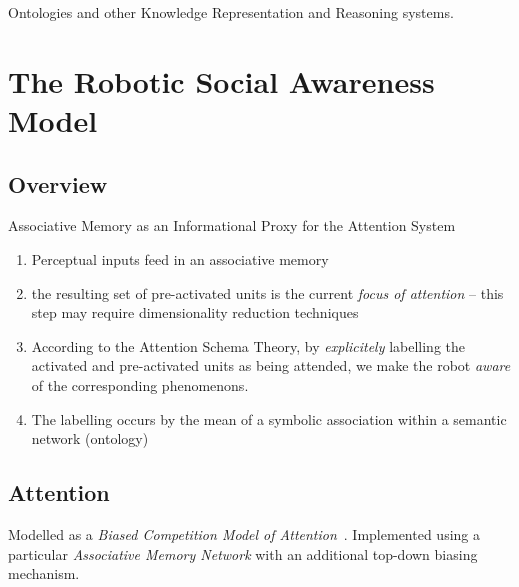 \documentclass[a4paper]{article}
\begin{document}
Ontologies and other Knowledge Representation and Reasoning systems.


\section{The Robotic Social Awareness Model}

\subsection{Overview}

Associative Memory as an Informational Proxy for the Attention System


\begin{enumerate}
    \item Perceptual inputs feed in an associative memory

    \item the resulting set of pre-activated units is the current
        \emph{focus of attention} -- this step may require dimensionality
        reduction techniques

    \item According to the Attention Schema Theory, by \emph{explicitely}
        labelling the activated and pre-activated units as being attended, we
        make the robot \emph{aware} of the corresponding phenomenons.

    \item The labelling occurs by the mean of a symbolic association within a
        semantic network (ontology)

\end{enumerate}

\subsection{Attention}

Modelled as a \emph{Biased Competition Model of
Attention}~\cite{desimone1995neural}.
Implemented using a particular \emph{Associative Memory Network} with an
additional top-down biasing mechanism.
\end{document}
